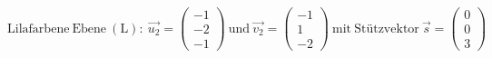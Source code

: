\documentclass[preview]{standalone}
\begin{document}
\begin{center}
$\mathrm{Lilafarbene \: Ebene \: (L):} \: \vec{u_2} = \begin{pmatrix} -1 \\ -2 \\ -1 \end{pmatrix} \: \mathrm{und} \: \vec{v_2} = \begin{pmatrix} -1 \\ 1 \\ -2 \end{pmatrix} \: \mathrm{mit \: Stützvektor} \: \vec{s} = \begin{pmatrix} 0 \\ 0 \\ 3 \end{pmatrix}$
\end{center}
\end{document}
